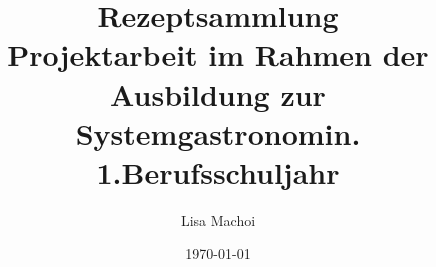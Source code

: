 \documentclass[10pt,a4paper]{article}
\begin{document}
\thispagestyle{empty}
\title{Rezeptsammlung\\
	\vspace{1cm}
	{\large Projektarbeit im Rahmen der Ausbildung zur Systemgastronomin.}\\
	{\small 1.Berufsschuljahr}
	\vspace{2cm}
}
\author{Lisa Machoi}
\date{\today}
\maketitle
\newpage
\thispagestyle{empty}
\tableofcontents
\setcounter{page}{0}
%
\newpage
\setcounter{page}{1}


















\end{document}
